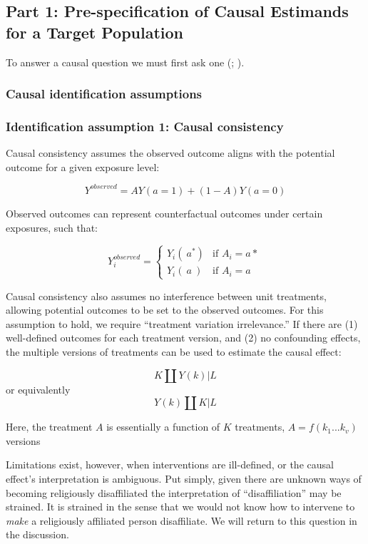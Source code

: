 \documentclass[
  singlecolumn]{article}
\begin{document}
\subsection{Part 1: Pre-specification of Causal Estimands for a Target
Population}\label{part-1-pre-specification-of-causal-estimands-for-a-target-population}

To answer a causal question we must first ask one
(;
).

\subsubsection{Causal identification
assumptions}\label{causal-identification-assumptions}

\subsubsection{Identification assumption 1: Causal
consistency}\label{identification-assumption-1-causal-consistency}

Causal consistency assumes the observed outcome aligns with the
potential outcome for a given exposure level:

\[Y^{observed} = AY(a=1) + (1-A)Y(a=0)\]

Observed outcomes can represent counterfactual outcomes under certain
exposures, such that:

\[
Y^{observed}_i = 
\begin{cases} 
Y_i(~a^*) & \text{if } A_i = a* \\
Y_i(~a~) & \text{if } A_i = a
\end{cases}
\]

Causal consistency also assumes no interference between unit treatments,
allowing potential outcomes to be set to the observed outcomes. For this
assumption to hold, we require ``treatment variation irrelevance.'' If
there are (1) well-defined outcomes for each treatment version, and (2)
no confounding effects, the multiple versions of treatments can be used
to estimate the causal effect:

\[K \coprod Y(k) | L\] or equivalently \[Y(k) \coprod K | L\]

Here, the treatment \(A\) is essentially a function of \(K\) treatments,
\(A = f(k_1...k_v)\) versions

Limitations exist, however, when interventions are ill-defined, or the
causal effect's interpretation is ambiguous. Put simply, given there are
unknown ways of becoming religiously disaffiliated the interpretation of
``disaffiliation'' may be strained. It is strained in the sense that we
would not know how to intervene to \emph{make} a religiously affiliated
person disaffiliate. We will return to this question in the discussion.
\end{document}
